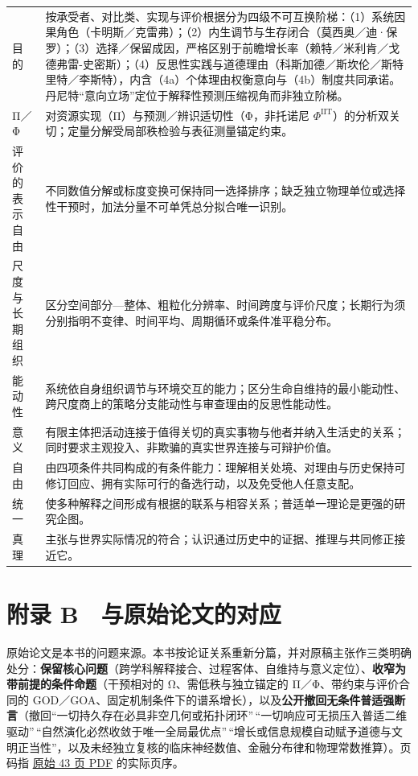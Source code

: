 \documentclass[
  11pt,
  oneside]{book}
\begin{document}
{\begin{longtable}[]{@{}
  >{\raggedright\arraybackslash}p{}
  >{\raggedright\arraybackslash}p{}@{}}
目的 & 按承受者、对比类、实现与评价根据分为四级不可互换阶梯：（1）系统因果角色（卡明斯／克雷弗）；（2）内生调节与生存闭合（莫西奥／迪·保罗）；（3）选择／保留成因，严格区别于前瞻增长率（赖特／米利肯／戈德弗雷-史密斯）；（4）反思性实践与道德理由（科斯加德／斯坎伦／斯特里特／李斯特），内含（4a）个体理由权衡意向与（4b）制度共同承诺。丹尼特``意向立场''定位于解释性预测压缩视角而非独立阶梯。 \\
Π／Φ & 对资源实现（Π）与预测／辨识适切性（Φ，非托诺尼 \(\Phi^{\mathrm{IIT}}\)）的分析双关切；定量分解受局部秩检验与表征测量锚定约束。 \\
评价的表示自由 & 不同数值分解或标度变换可保持同一选择排序；缺乏独立物理单位或选择性干预时，加法分量不可单凭总分拟合唯一识别。 \\
尺度与长期组织 & 区分空间部分---整体、粗粒化分辨率、时间跨度与评价尺度；长期行为须分别指明不变律、时间平均、周期循环或条件准平稳分布。 \\
能动性 & 系统依自身组织调节与环境交互的能力；区分生命自维持的最小能动性、跨尺度商上的策略分支能动性与审查理由的反思性能动性。 \\
意义 & 有限主体把活动连接于值得关切的真实事物与他者并纳入生活史的关系；同时要求主观投入、非欺骗的真实世界连接与可辩护价值。 \\
自由 & 由四项条件共同构成的有条件能力：理解相关处境、对理由与历史保持可修订回应、拥有实际可行的备选行动，以及免受他人任意支配。 \\
统一 & 使多种解释之间形成有根据的联系与相容关系；普适单一理论是更强的研究企图。 \\
真理 & 主张与世界实际情况的符合；认识通过历史中的证据、推理与共同修正接近它。 \\
\end{longtable}
}

\chapter{附录 B　与原始论文的对应}\label{ph-app-b}

原始论文是本书的问题来源。本书按论证关系重新分篇，并对原稿主张作三类明确处分：\textbf{保留核心问题}（跨学科解释接合、过程客体、自维持与意义定位）、\textbf{收窄为带前提的条件命题}（干预相对的 Ω、需低秩与独立锚定的 Π／Φ、带约束与评价合同的 GOD／GOA、固定机制条件下的谱系增长），以及\textbf{公开撤回无条件普适强断言}（撤回``一切持久存在必具非空几何或拓扑闭环''\,``一切响应可无损压入普适二维驱动''\,``自然演化必然收敛于唯一全局最优点''\,``增长或信息规模自动赋予道德与文明正当性''，以及未经独立复核的临床神经数值、金融分布律和物理常数推算）。页码指 \href{https://github.com/MurphyHoops/UEOT/blob/3d443ec29eb17af1fc00699a74e2d42d73516d81/UEOT_v3_top.pdf}{原始 43 页 PDF} 的实际页序。
\end{document}
